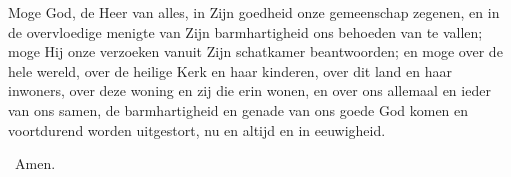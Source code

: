 \documentclass[12pt,twoside,a5paper]{article}
\begin{document}
\begin{halfparskip}
    Moge God, de Heer van alles, in Zijn goedheid onze gemeenschap zegenen, en in de overvloedige menigte van Zijn barmhartigheid ons behoeden van te vallen; moge Hij onze verzoeken vanuit Zijn schatkamer beantwoorden; en moge over de hele wereld, over de heilige Kerk en haar kinderen, over dit land en haar inwoners, over deze woning en zij die erin wonen, en over ons allemaal en ieder van ons samen, de barmhartigheid en genade van ons goede God komen en voortdurend worden uitgestort, nu en altijd en in eeuwigheid.

  \rr~Amen.
\end{halfparskip}

\end{document}
